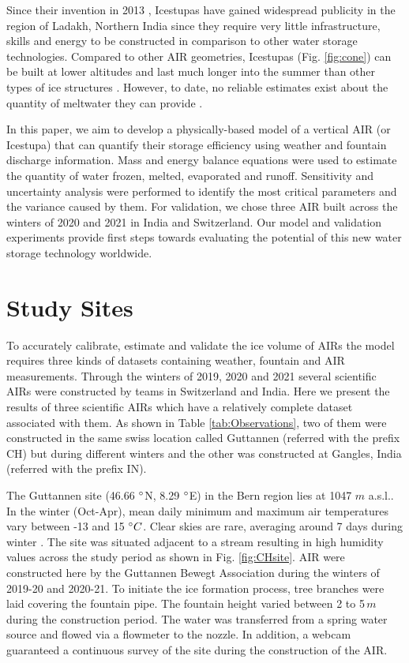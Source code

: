 \documentclass[utf8]{frontiersSCNS} %
\begin{document}
Since their invention in 2013 \citep{campaign}, Icestupas have gained widespread publicity in the region of Ladakh, Northern India since they require very little infrastructure, skills and energy to be constructed in comparison to other water storage technologies. Compared to other AIR geometries, Icestupas (Fig. \ref{fig:cone}) can be built at lower altitudes and last much longer into the summer than other types of ice structures \citep{campaign}. However, to date, no reliable estimates exist about the quantity of meltwater they can provide \citep{Nusser_2018}.

In this paper, we aim to develop a physically-based model of a vertical AIR (or Icestupa) that can quantify their
storage efficiency using weather and fountain discharge information. Mass and energy balance equations were used to estimate the quantity of water frozen, melted, evaporated and runoff. Sensitivity and uncertainty analysis were
performed to identify the most critical parameters and the variance caused by them. For validation, we chose three AIR built across the winters of 2020 and 2021 in India and Switzerland. Our model and validation experiments provide first steps towards evaluating the potential of this new water storage technology worldwide.

\section{Study Sites}
To accurately calibrate, estimate and validate the ice volume of AIRs the model requires three kinds of datasets
containing weather, fountain and AIR measurements. Through the winters of 2019, 2020 and 2021 several scientific AIRs
were constructed by teams in Switzerland and India. Here we present the results of three scientific AIRs which have a
relatively complete dataset associated with them. As shown in Table \ref{tab:Observations}, two of them were
constructed in the same swiss location called Guttannen (referred with the prefix CH) but during different winters and
the other was constructed at Gangles, India (referred with the prefix IN).

The Guttannen site (46.66 $\degree$N, 8.29 $\degree$E) in the Bern region lies at 1047 $m$ a.s.l.. In the winter (Oct-Apr), mean
daily minimum and maximum air temperatures vary between -13 and 15 $\degree C$. Clear skies are rare, averaging around 7
days during winter \citep{eispalast}. The site was situated adjacent to a stream resulting in high humidity values
across the study period as shown in Fig. \ref{fig:CHsite}. AIR were constructed here by the Guttannen Bewegt Association
during the winters of 2019-20 and 2020-21. To initiate the ice formation process, tree branches were laid covering the
fountain pipe.  The fountain height varied between 2 to 5\,$m$ during the construction period. The water was transferred
from a spring water source and flowed via a flowmeter to the nozzle. In addition, a webcam guaranteed a continuous
survey of the site during the construction of the AIR.
\end{document}
